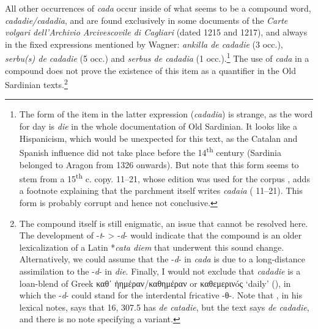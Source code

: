 \documentclass[output=paper,colorlinks,citecolor=brown]{langscibook}
\begin{document}
All other occurrences of \textit{cada} occur inside of what seems to be a compound word, \textit{cadadie/cadadia}, and are found exclusively in some documents of the \textit{Carte volgari dell’Archivio Arcivescovile di Cagliari} (dated 1215 and 1217), and always in the fixed expressions mentioned by Wagner: \textit{ankilla de cadadie} (3 occ.), \textit{serbu(s) de cadadie} (5 occ.) and \textit{serbus de cadadia} (1 occ.).\footnote{\label{fn:men23}The form of the item in the latter expression (\textit{cadadia}) is strange, as the word for day is \textit{die} in the whole documentation of Old Sardinian. It looks like a Hispanicism, which would be unexpected for this text, as the Catalan and Spanish influence did not take place before the 14\textsuperscript{th} century (Sardinia belonged to Aragon from 1326 onwards). But note that this form seems to stem from a 15\textsuperscript{th} c. copy.  11--21, whose edition was used for the corpus , adds a footnote explaining that the parchment itself writes \textit{cadaia} ( 11--21). This form is probably corrupt and hence not conclusive.} The use of \textit{cada} in a compound does not prove the existence of this item as a quantifier in the Old Sardinian texts.\footnote{The compound itself is still enigmatic, an issue that cannot be resolved here. The development of -\textit{t}- > -\textit{d}- would indicate that the compound is an older lexicalization of a Latin *\textit{cata diem} that underwent this sound change. Alternatively, we could assume that the -\textit{d}- in \textit{cada} is due to a long-distance assimilation to the -\textit{d}- in \textit{die}. Finally, I would not exclude that \textit{cadadie} is a loan-blend of Greek καθʹ ἡημέραν/καθημέραν or καθεμερινóς ‘daily’ (\cite[][612]{Sophocles1900}), in which the -\textit{d}-  could stand for the interdental fricative -θ-. Note that \citet[][319]{Solmi1905}, in his lexical notes, says that  16, 307.5 has \textit{de catadie}, but the text says \textit{de cadadie}, and there is no note specifying a variant.}
\end{document}
